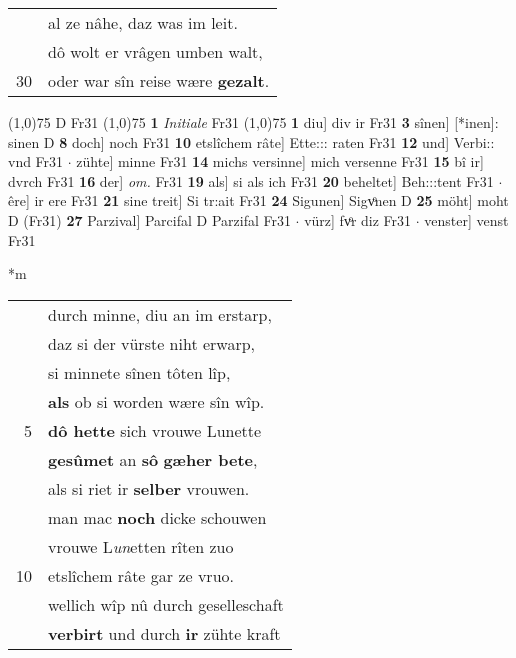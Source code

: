 \documentclass[8pt,a4paper,notitlepage]{article}
\begin{document}
\begin{table}[ht]
\begin{minipage}[t]{0.5\linewidth}
\begin{tabular}{rl}
 & al ze nâhe, daz was im leit.\\ 
 & dô wolt er vrâgen umben walt,\\ 
30 & oder war sîn reise wære \textbf{gezalt}.\\ 
\end{tabular}
\scriptsize
\line(1,0){75} \newline
D Fr31 \newline
\line(1,0){75} \newline
\textbf{1} \textit{Initiale} Fr31  \newline
\line(1,0){75} \newline
\textbf{1} diu] div ir Fr31 \textbf{3} sînen] [*inen]: sinen D \textbf{8} doch] noch Fr31 \textbf{10} etslîchem râte] Ette::: raten Fr31 \textbf{12} und] Verbi:: vnd Fr31  $\cdot$ zühte] minne Fr31 \textbf{14} michs versinne] mich versenne Fr31 \textbf{15} bî ir] dvrch Fr31 \textbf{16} der] \textit{om.} Fr31 \textbf{19} als] si als ich Fr31 \textbf{20} beheltet] Beh:::tent Fr31  $\cdot$ êre] ir ere Fr31 \textbf{21} sine treit] Si tr:ait Fr31 \textbf{24} Sigunen] Sigvͦnen D \textbf{25} möht] moht D (Fr31) \textbf{27} Parzival] Parcifal D Parzifal Fr31  $\cdot$ vürz] fvͦr diz Fr31  $\cdot$ venster] venst Fr31 \newline
\end{minipage}
\hspace{0.5cm}
\begin{minipage}[t]{0.5\linewidth}
\small
\begin{center}*m
\end{center}
\begin{tabular}{rl}
 & durch minne, diu an im erstarp,\\ 
 & daz si der vürste niht erwarp,\\ 
 & si minnete sînen tôten lîp,\\ 
 & \textbf{als} ob si worden wære sîn wîp.\\ 
5 & \textbf{dô hette} sich vrouwe Lunette\\ 
 & \textbf{gesûmet} an \textbf{sô} \textbf{gæher bete},\\ 
 & als si riet ir \textbf{selber} vrouwen.\\ 
 & man mac \textbf{noch} dicke schouwen\\ 
 & vrouwe L\textit{un}etten rîten zuo\\ 
10 & etslîchem râte gar ze vruo.\\ 
 & wellich wîp nû durch geselleschaft\\ 
 & \textbf{verbirt} und durch \textbf{ir} zühte kraft\\ 

\end{tabular}
\end{minipage}
\end{table}
\end{document}
